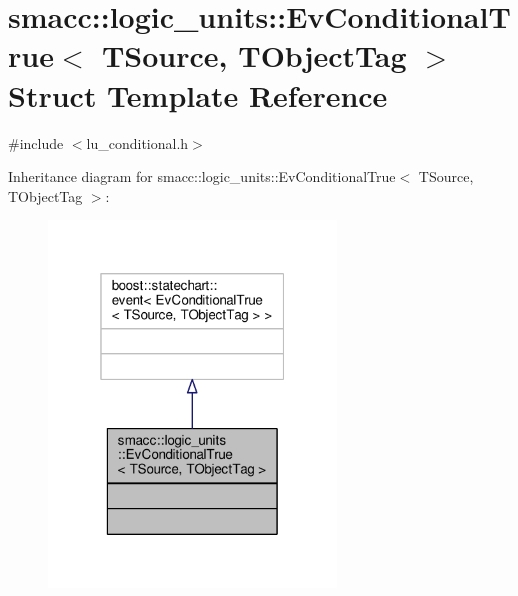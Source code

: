 \hypertarget{structsmacc_1_1logic__units_1_1EvConditionalTrue}{}\section{smacc\+:\+:logic\+\_\+units\+:\+:Ev\+Conditional\+True$<$ T\+Source, T\+Object\+Tag $>$ Struct Template Reference}
\label{structsmacc_1_1logic__units_1_1EvConditionalTrue}


{\ttfamily \#include $<$lu\+\_\+conditional.\+h$>$}



Inheritance diagram for smacc\+:\+:logic\+\_\+units\+:\+:Ev\+Conditional\+True$<$ T\+Source, T\+Object\+Tag $>$\+:\nopagebreak
\begin{figure}[H]
\begin{center}
\leavevmode
\includegraphics[width=217pt]{structsmacc_1_1logic__units_1_1EvConditionalTrue__inherit__graph}
\end{center}
\end{figure}


